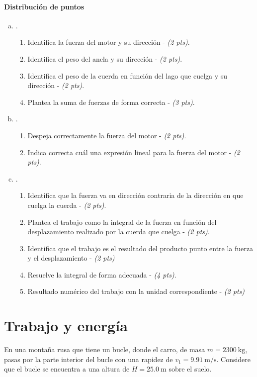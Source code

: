 \documentclass[
  12pt,
]{article}
\newcommand{\pts}[1]{ {\it (#1 pts)}}
\newcommand{\unit}[1]{\:\mathrm{#1}}
\begin{document}
\begin{enumerate}[a)]
  \paragraph{Distribución de puntos}
  \renewcommand{\labelenumiii}{\theenumi\theenumii-\arabic{enumiii})}
  \begin{enumerate}[a)]
    \item .
    \begin{enumerate}
      \item Identifica la fuerza del motor y su dirección - \pts{2}.
      \item Identifica el peso del ancla y su dirección - \pts{2}.
      \item Identifica el peso de la cuerda en función del lago que cuelga y su dirección
        - \pts{2}.
      \item Plantea la suma de fuerzas de forma correcta - \pts{3}.
    \end{enumerate}
    \item .
    \begin{enumerate}
      \item Despeja correctamente la fuerza del motor - \pts{2}.
      \item Indica correcta cuál una expresión lineal para la fuerza del motor - \pts{2}.
    \end{enumerate}
    \item .
    \begin{enumerate}
    \item Identifica que la fuerza va en dirección contraria de la dirección en
      que cuelga la cuerda - \pts{2}.
    \item Plantea el trabajo como la integral de la fuerza en función del desplazamiento
      realizado por la cuerda que cuelga - \pts{2}.
    \item Identifica que el trabajo es el resultado del producto punto entre la fuerza
      y el desplazamiento - \pts{2}
    \item Resuelve la integral de forma adecuada - \pts{4}.
    \item Resultado numérico del trabajo con la unidad correspondiente - \pts{2}
    \end{enumerate}
  \end{enumerate}
\end{enumerate}

\newpage
\section{Trabajo y energía}
En una montaña rusa que tiene un bucle, donde el carro, de masa $m = 2300\unit{kg}$,
pasas por la parte interior del bucle con una rapidez de $v_1 = 9.91 \unit{m/s}$.
Considere que el bucle se encuentra a una altura de $H = 25.0 \unit{m}$ sobre el suelo.
\end{document}
